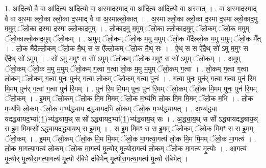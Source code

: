 \documentclass[17pt]{extarticle}
\begin{document}
1. आ॒दि॒त्यो वै वा आ॑दि॒त्य आ॑दि॒त्यो वा अ॒स्माद॒स्माद् वा आ॑दि॒त्य आ॑दि॒त्यो वा अ॒स्मात् । . वा अ॒स्माद॒स्माद् वै वा अ॒स्मा ल्लो॒का ल्लो॒का द॒स्माद् वै वा अ॒स्माल्लो॒कात् । . अ॒स्मा ल्लो॒का ल्लो॒का द॒स्मा द॒स्मा ल्लो॒काद॒मु म॒मुम् ॅलो॒का द॒स्मा द॒स्मा ल्लो॒काद॒मुम् । . लो॒काद॒मु म॒मुम् ॅलो॒का ल्लो॒काद॒मुम् ॅलो॒कम् ॅलो॒क म॒मुम् ॅलो॒काल्लो॒काद॒मुम् ॅलो॒कम् । . अ॒मुम् ॅलो॒कम् ॅलो॒क म॒मु म॒मुम् ॅलो॒क मै॑दैल्लो॒क म॒मु म॒मुम् ॅलो॒क मै᳚त् । . लो॒क मै॑दैल्लो॒कम् ॅलो॒क मै॒थ् स स ऐ᳚ल्लो॒कम् ॅलो॒क मै॒थ् सः । . ऐ॒थ् स स ऐ॑दै॒थ् सो॑ ऽमु म॒मुꣳ स ऐ॑दै॒थ् सो॑ ऽमुम् । . सो॑ ऽमु म॒मुꣳ स सो॑ ऽमुम् ॅलो॒कम् ॅलो॒क म॒मुꣳ स सो॑ ऽमुम् ॅलो॒कम् । . अ॒मुम् ॅलो॒कम् ॅलो॒क म॒मु म॒मुम् ॅलो॒कम् ग॒त्वा ग॒त्वा लो॒क म॒मु म॒मुम् ॅलो॒कम् ग॒त्वा । . लो॒कम् ग॒त्वा ग॒त्वा लो॒कम् ॅलो॒कम् ग॒त्वा पुनः॒ पुन॑र् ग॒त्वा लो॒कम् ॅलो॒कम् ग॒त्वा पुनः॑ । . ग॒त्वा पुनः॒ पुन॑र् ग॒त्वा ग॒त्वा पुन॑ रि॒म मि॒मम् पुन॑र् ग॒त्वा ग॒त्वा पुन॑ रि॒मम् । . पुन॑ रि॒म मि॒मम् पुनः॒ पुन॑ रि॒मम् ॅलो॒कम् ॅलो॒क मि॒मम् पुनः॒ पुन॑ रि॒मम् ॅलो॒कम् । . इ॒मम् ॅलो॒कम् ॅलो॒क मि॒म मि॒मम् ॅलो॒क म॒भ्य॑भि लो॒क मि॒म मि॒मम् ॅलो॒क म॒भि । . लो॒क म॒भ्य॑भि लो॒कम् ॅलो॒क म॒भ्य॑द्ध्याय दद्ध्यायद॒भि लो॒कम् ॅलो॒क म॒भ्य॑द्ध्यायत् । . अ॒भ्य॑द्ध्या यदद्ध्यायद॒भ्या᳚(1॒)भ्य॑द्ध्याय॒थ् स सो᳚ ऽद्ध्यायद॒भ्या᳚(1॒)भ्य॑द्ध्याय॒थ् सः । . अ॒द्ध्या॒य॒थ् स सो᳚ ऽद्ध्यायदद्ध्याय॒थ् स इ॒म मि॒मम्सो᳚ ऽद्ध्यायदद्ध्याय॒थ् स इ॒मम् । . स इ॒म मि॒मꣳ स स इ॒मम् ॅलो॒कम् ॅलो॒क मि॒मꣳ स स इ॒मम् ॅलो॒कम् । . इ॒मम् ॅलो॒कम् ॅलो॒क मि॒म मि॒मम् ॅलो॒क मा॒गत्या॒गत्य॑ लो॒क मि॒म मि॒मम् ॅलो॒क मा॒गत्य॑ । . लो॒क मा॒गत्या॒गत्य॑ लो॒कम् ॅलो॒क मा॒गत्य॑ मृ॒त्योर् मृ॒त्योरा॒गत्य॑ लो॒कम् ॅलो॒क मा॒गत्य॑ मृ॒त्योः । . आ॒गत्य॑ मृ॒त्योर् मृ॒त्योरा॒गत्या॒गत्य॑ मृ॒त्यो र॑बिभे दबिभेन् मृ॒त्योरा॒गत्या॒गत्य॑ मृ॒त्यो र॑बिभेत् । \newline
\end{document}
